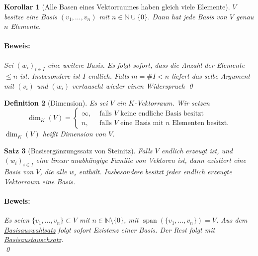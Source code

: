 \documentclass{report}
\newcommand{\IN}[1]{\index{#1|BH}}
\newcommand{\N}{\mathbb{N}}
\DeclareMathOperator{\Span}{span}
\theoremstyle{customrem}
\theoremstyle{customdef}
\newtheorem{definition}{Definition}[chapter]
\newtheorem{korrolar}[definition]{Korollar}
\newtheorem{satz}[definition]{Satz}
\renewenvironment{proof}{\paragraph{Beweis: }}{\qed}
\theoremstyle{customenv}
\begin{document}
	\begin{korrolar}[Alle Basen eines Vektorraumes haben gleich viele Elemente]
		\(V\) besitze eine Basis \((v_1, \dots, v_n)\) mit \(n \in \N \cup \{0\}\). Dann hat jede Basis von \(V\) genau \(n\) Elemente.
		
		\begin{proof}
			Sei \((w_i)_{i \in I}\) eine weitere Basis. Es folgt sofort, dass die Anzahl der Elemente \(\le n\) ist. Insbesondere ist \(I\) endlich. Falls \(m = \#I < n\) liefert das selbe Argument mit \((v_i)\) und \((w_i)\) vertauscht wieder einen Widerspruch \Lightning
		\end{proof}
	\end{korrolar}
	\vspace{.25cm}
	\begin{definition}[Dimension]
		\IN{Dimension}
		Es sei \(V\) ein \(K\)-Vektorraum. Wir setzen
		\[\dim_K(V) = \begin{cases}\infty,&\text{ falls \(V\) keine endliche Basis besitzt}\\n,&\text{ falls \(V\) eine Basis mit \(n\) Elementen besitzt.}\end{cases}\]
		\(\dim_K(V)\) heißt Dimension von \(V\).
	\end{definition}
	
	\begin{satz}[Basisergänzungssatz von Steinitz]
		\label{satz218}
		Falls \(V\) endlich erzeugt ist, und \((w_i)_{i \in I}\) eine linear unabhängige Familie von Vektoren ist, dann existiert eine Basis von \(V\), die alle \(w_i\) enthält. Insbesondere besitzt jeder endlich erzeugte Vektorraum eine Basis.\\
		
		\begin{proof}
			Es seien \(\{v_1, \dots, v_n\} \subset V\) mit \(n \in \N \setminus\{0\}\), mit \(\Span(\{v_1, \dots, v_n\}) = V\). Aus dem \hyperref[satz213]{Basisauswahlsatz} folgt sofort Existenz einer Basis. Der Rest folgt mit \hyperref[satz215]{Basisaustauschsatz}.\\
		\end{proof}
	\end{satz}
	
\end{document}
